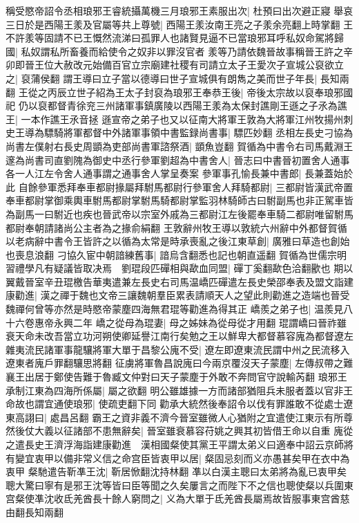 稱受愍帝詔令丞相琅邪王睿統攝萬機三月琅邪王素服出次|{
	杜預曰出次避正寢}
舉哀三日於是西陽王羕及官屬等共上尊號|{
	西陽王羕汝南王亮之子羕余亮翻上時掌翻}
王不許羕等固請不已王慨然流涕曰孤罪人也諸賢見逼不已當琅邪耳呼私奴命駕將歸國|{
	私奴謂私所畜養而給使令之奴非以罪沒官者}
羕等乃請依魏晉故事稱晉王許之辛卯即晉王位大赦改元始備百官立宗廟建社稷有司請立太子王愛次子宣城公裒欲立之|{
	裒蒲侯翻}
謂王導曰立子當以德導曰世子宣城俱有朗雋之美而世子年長|{
	長知兩翻}
王從之丙辰立世子紹為王太子封裒為琅邪王奉恭王後|{
	帝後太宗故以裒奉琅邪國祀}
仍以裒都督青徐兖三州諸軍事鎮廣陵以西陽王羕為太保封譙剛王遜之子氶為譙王|{
	一本作譙王氶音拯}
遜宣帝之弟子也又以征南大將軍王敦為大將軍江州牧揚州刺史王導為驃騎將軍都督中外諸軍事領中書監録尚書事|{
	驃匹妙翻}
丞相左長史刁協為尚書左僕射右長史周顗為吏部尚書軍諮祭酒|{
	顗魚豈翻}
賀循為中書令右司馬戴淵王邃為尚書司直劉隗為御史中丞行參軍劉超為中書舍人|{
	晉志曰中書晉初置舍人通事各一人江左令舍人通事謂之通事舍人掌呈奏案}
參軍事孔愉長兼中書郎|{
	長兼蓋始於此}
自餘參軍悉拜奉車都尉掾屬拜駙馬都尉行參軍舍人拜騎都尉|{
	三都尉皆漢武帝置奉車都尉掌御乘輿車駙馬都尉掌駙馬騎都尉掌監羽林騎師古曰駙副馬也非正駕車皆為副馬一曰駙近也疾也晉武帝以宗室外戚為三都尉江左後罷奉車騎二都尉唯留駙馬都尉奉朝請諸尚公主者為之掾俞絹翻}
王敦辭州牧王導以敦統六州辭中外都督賀循以老病辭中書令王皆許之以循為太常是時承喪亂之後江東草創|{
	廣雅曰草造也創始也喪息浪翻}
刁協久宦中朝諳練舊事|{
	諳烏含翻悉也記也朝直遥翻}
賀循為世儒宗明習禮學凡有疑議皆取决焉　劉琨段匹磾相與歃血同盟|{
	磾丁奚翻歃色洽翻歠也}
期以翼戴晉室辛丑琨檄告華夷遣兼左長史右司馬温嶠匹磾遣左長史榮邵奉表及盟文詣建康勸進|{
	漢之禪于魏也文帝三讓魏朝羣臣累表請順天人之望此則勸進之造端也晉受魏禪何曾等亦然是時愍帝蒙塵四海無君琨等勸進為得其正}
嶠羨之弟子也|{
	温羨見八十六卷惠帝永興二年}
嶠之從母為琨妻|{
	母之姊妹為從母從才用翻}
琨謂嶠曰晉祚雖衰天命未改吾當立功河朔使卿延譽江南行矣勉之王以鮮卑大都督慕容廆為都督遼左雜夷流民諸軍事龍驤將軍大單于昌黎公廆不受|{
	遼左即遼東流民謂中州之民流移入遼東者廆戶罪翻驤思將翻}
征虜將軍魯昌說廆曰今兩京覆沒天子蒙塵|{
	左傳叔帶之難襄王出居于鄭使告難于魯臧文仲對曰天子蒙塵于外敢不奔問官守說輸芮翻}
琅邪王承制江東為四海所係屬|{
	屬之欲翻}
明公雖雄據一方而諸部猶阻兵未服者蓋以官非王命故也謂宜通使琅邪|{
	使疏吏翻下同}
勸承大統然後奉詔令以伐有罪誰敢不從處士遼東高詡曰|{
	處昌呂翻}
霸王之資非義不濟今晉室雖微人心猶附之宜遣使江東示有所尊然後仗大義以征諸部不患無辭矣|{
	晉室雖衰慕容苻姚之興其初皆借王命以自重}
廆從之遣長史王濟浮海詣建康勸進　漢相國粲使其黨王平謂太弟义曰適奉中詔云京師將有變宜衷甲以備非常义信之命宫臣皆衷甲以居|{
	粲固忌刻而义亦愚甚矣甲在衣中為衷甲}
粲馳遣告靳凖王沈|{
	靳居惞翻沈持林翻}
凖以白漢主聰曰太弟將為亂已衷甲矣聰大驚曰寧有是邪王沈等皆曰臣等聞之久矣屢言之而陛下不之信也聰使粲以兵圍東宫粲使凖沈收氐羌酋長十餘人窮問之|{
	义為大單于氐羌酋長屬焉故皆服事東宫酋慈由翻長知兩翻}
